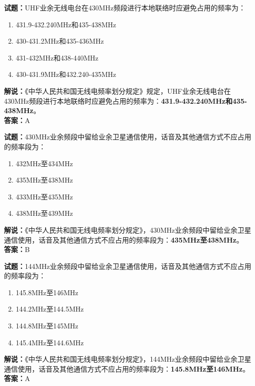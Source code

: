 \documentclass{ctexbook}
\begin{document}
\vspace{\baselineskip}

\noindent\textbf{试题：}UHF业余无线电台在430\unit{\MHz}频段进行本地联络时应避免占用的频率为：
\begin{enumerate}[leftmargin=3em]
  \item 431.9-432.240\unit{\MHz}和435-438\unit{\MHz}
  \item 430-431.2\unit{\MHz}和435-436\unit{\MHz}
  \item 431-432\unit{\MHz}和438-440\unit{\MHz}
  \item 430-431.9\unit{\MHz}和432.240-435\unit{\MHz}
\end{enumerate}
\noindent\textbf{解说：}《中华人民共和国无线电频率划分规定》规定，UHF业余无线电台在430\unit{\MHz}频段进行本地联络时应避免占用的频率为：\textbf{431.9-432.240\unit{\MHz}和435-438\unit{\MHz}}。\\\noindent\textbf{答案：}A

\vspace{\baselineskip}

\noindent\textbf{试题：}430\unit{\MHz}业余频段中留给业余卫星通信使用，话音及其他通信方式不应占用的频率段为：
\begin{enumerate}[leftmargin=3em]
  \item 432\unit{\MHz}至434\unit{\MHz}
  \item 435\unit{\MHz}至438\unit{\MHz}
  \item 433\unit{\MHz}至435\unit{\MHz}
  \item 438\unit{\MHz}至439\unit{\MHz}
\end{enumerate}
\noindent\textbf{解说：}《中华人民共和国无线电频率划分规定》，430\unit{\MHz}业余频段中留给业余卫星通信使用，话音及其他通信方式不应占用的频率段为：\textbf{435\unit{\MHz}至438\unit{\MHz}}。\\\noindent\textbf{答案：}B

\vspace{\baselineskip}

\noindent\textbf{试题：}144\unit{\MHz}业余频段中留给业余卫星通信使用，话音及其他通信方式不应占用的频率段为：
\begin{enumerate}[leftmargin=3em]
  \item 145.8\unit{\MHz}至146\unit{\MHz}
  \item 144.2\unit{\MHz}至144.5\unit{\MHz}
  \item 144.8\unit{\MHz}至145\unit{\MHz}
  \item 145.4\unit{\MHz}至144.6\unit{\MHz}
\end{enumerate}
\noindent\textbf{解说：}《中华人民共和国无线电频率划分规定》，144\unit{\MHz}业余频段中留给业余卫星通信使用，话音及其他通信方式不应占用的频率段为：\textbf{145.8\unit{\MHz}至146\unit{\MHz}}。\\\noindent\textbf{答案：}A
\end{document}
